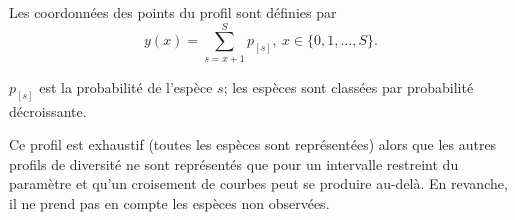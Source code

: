 \documentclass[
  11pt,
  french,
  a4paper,
  extrafontsizes,onecolumn,openright
  ]{memoir}
\newenvironment{Shaded}{\begin{snugshade}}{\end{snugshade}}
\newcommand{\AttributeTok}[1]{\textcolor[rgb]{0.13,0.29,0.53}{#1}}
\newcommand{\CommentTok}[1]{\textcolor[rgb]{0.56,0.35,0.01}{\textit{#1}}}
\newcommand{\DecValTok}[1]{\textcolor[rgb]{0.00,0.00,0.81}{#1}}
\newcommand{\FunctionTok}[1]{\textcolor[rgb]{0.13,0.29,0.53}{\textbf{#1}}}
\newcommand{\NormalTok}[1]{#1}
\newcommand{\OtherTok}[1]{\textcolor[rgb]{0.56,0.35,0.01}{#1}}
\newcommand{\SpecialCharTok}[1]{\textcolor[rgb]{0.81,0.36,0.00}{\textbf{#1}}}
\newcommand{\StringTok}[1]{\textcolor[rgb]{0.31,0.60,0.02}{#1}}
\begin{document}
\begin{Shaded}
\end{Shaded}

\normalsize

Les coordonnées des points du profil sont définies par
\begin{equation}
  \label{eq:ProfilQueue}
  y(x) = \sum_{s=x+1}^{S}{p_{[s]}},\ x\in \{0, 1, \dots, S\}.
\end{equation}

\(p_{[s]}\) est la probabilité de l'espèce \(s\); les espèces sont classées par probabilité décroissante.

Ce profil est exhaustif (toutes les espèces sont représentées) alors que les autres profils de diversité ne sont représentés que pour un intervalle restreint du paramètre et qu'un croisement de courbes peut se produire au-delà.
En revanche, il ne prend pas en compte les espèces non observées.
\end{document}
